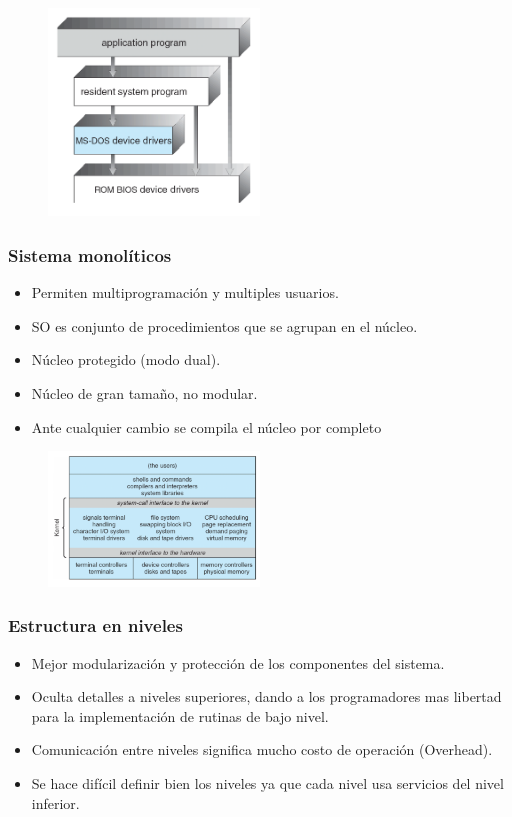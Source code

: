 \documentclass{templateNote}
\begin{document}
\begin{figure}[H]
    \centering
    \includegraphics[width=0.5\textwidth]{img/estSim.png}
\end{figure}

\subsubsection*{Sistema monolíticos}
\begin{itemize}
    \item Permiten multiprogramación y multiples usuarios.
    \item SO es conjunto de procedimientos que se agrupan en el núcleo.
    \item Núcleo protegido (modo dual).
    \item Núcleo de gran tamaño, no modular.
    \item Ante cualquier cambio se compila el núcleo por completo
\end{itemize}

\begin{figure}[H]
    \centering
    \includegraphics[width=0.5\textwidth]{img/estMono.png}
\end{figure}

\subsubsection*{Estructura en niveles}
\begin{itemize}
    \item Mejor modularización y protección de los componentes del sistema.
    \item Oculta detalles a niveles superiores, dando a los programadores mas libertad para la implementación de rutinas de bajo nivel.
    \item Comunicación entre niveles significa mucho costo de operación (Overhead).
    \item Se hace difícil definir bien los niveles ya que cada nivel usa servicios del nivel inferior.
\end{itemize}
\end{document}
